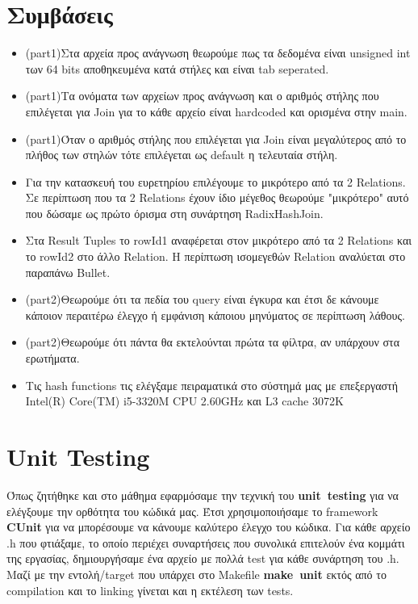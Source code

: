 \documentclass[12pt, a4paper]{article}
\begin{document}
\section{Συμβάσεις}
\begin{itemize}
	\item (part1)Στα αρχεία προς ανάγνωση θεωρούμε πως τα δεδομένα είναι unsigned int των 64 bits αποθηκευμένα κατά στήλες και είναι tab seperated.
	\item (part1)Τα ονόματα των αρχείων προς ανάγνωση και ο αριθμός στήλης που επιλέγεται για Join για το κάθε αρχείο είναι hardcoded και ορισμένα στην main.
	\item (part1)Όταν ο αριθμός στήλης που επιλέγεται για Join είναι μεγαλύτερος από το πλήθος των στηλών τότε επιλέγεται ως default η τελευταία στήλη.
	\item Για την κατασκευή του ευρετηρίου επιλέγουμε το μικρότερο από τα 2 Relations. Σε περίπτωση που τα 2 Relations έχουν ίδιο μέγεθος θεωρούμε "μικρότερο" αυτό που δώσαμε ως πρώτο όρισμα στη συνάρτηση RadixHashJoin.
	\item Στα Result Tuples το rowId1 αναφέρεται στον μικρότερο από τα 2 Relations και το rowId2 στο άλλο Relation. Η περίπτωση ισομεγεθών Relation αναλύεται στο παραπάνω Bullet.
	\item (part2)Θεωρούμε ότι τα πεδία του query είναι έγκυρα και έτσι δε κάνουμε κάποιον περαιτέρω έλεγχο ή εμφάνιση κάποιου μηνύματος σε περίπτωση λάθους.
	\item (part2)Θεωρούμε ότι πάντα θα εκτελούνται πρώτα τα φίλτρα, αν υπάρχουν στα ερωτήματα.
	\item Τις hash functions τις ελέγξαμε πειραματικά στο σύστημά μας με επεξεργαστή Intel(R) Core(TM) i5-3320M CPU 2.60GHz και L3 cache 3072K 
\end{itemize}


\section{Unit Testing}
Όπως ζητήθηκε και στο μάθημα εφαρμόσαμε την τεχνική του \textbf{unit\ testing} για να ελέγξουμε την ορθότητα του κώδικά μας. Έτσι χρησιμοποιήσαμε το framework \textbf{CUnit} για να μπορέσουμε να κάνουμε καλύτερο έλεγχο του κώδικα. Για κάθε αρχείο .h που φτιάξαμε, το οποίο περιέχει συναρτήσεις που συνολικά επιτελούν ένα κομμάτι της εργασίας, δημιουργήσαμε ένα αρχείο με πολλά test για κάθε συνάρτηση του .h. Μαζί με την εντολή/target που υπάρχει στο Makefile \textbf{make\ unit} εκτός από το compilation και το linking γίνεται και η εκτέλεση των tests.
\end{document}
